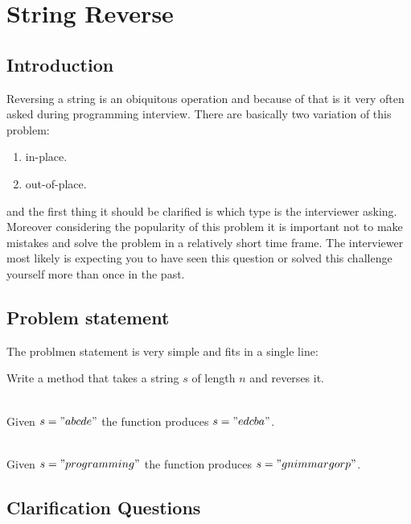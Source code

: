 %

\chapter{String Reverse}
\label{ch:string_reverse}
\section*{Introduction}
Reversing a string is an obiquitous operation and because of that is it very often asked during programming interview. There are basically two variation of this problem:
\begin{enumerate}
  \item in-place.
  \item out-of-place.
\end{enumerate}
and the first thing it should be clarified is which type is the interviewer asking.
Moreover considering the popularity of this problem it is important not to make mistakes and solve the problem in a relatively short time frame. The interviewer most likely is expecting you to have seen this question or solved this challenge yourself more than once in the past.


\section{Problem statement}
The problmen statement is very simple and fits in a single line:
\begin{exercise}
Write a method that takes a string $s$ of length $n$ and reverses it.
\end{exercise}

\begin{example}
	\hfill \\
	Given $s="abcde"$ the function produces $s="edcba"$.
\end{example}

\begin{example}
	\hfill \\
	Given $s="programming"$ the function produces $s="gnimmargorp"$.
\end{example}

\section{Clarification Questions}

